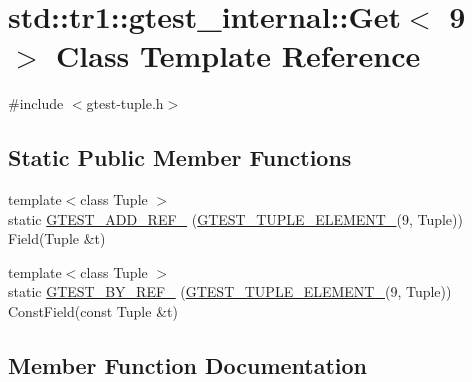 \hypertarget{classstd_1_1tr1_1_1gtest__internal_1_1Get_3_019_01_4}{}\section{std\+::tr1\+::gtest\+\_\+internal\+::Get$<$ 9 $>$ Class Template Reference}
\label{classstd_1_1tr1_1_1gtest__internal_1_1Get_3_019_01_4}


{\ttfamily \#include $<$gtest-\/tuple.\+h$>$}

\subsection*{Static Public Member Functions}
\begin{DoxyCompactItemize}
\item 
{\footnotesize template$<$class Tuple $>$ }\\static \mbox{\hyperlink{classstd_1_1tr1_1_1gtest__internal_1_1Get_3_019_01_4_add31197dfdb381d265e221ed62129f45}{G\+T\+E\+S\+T\+\_\+\+A\+D\+D\+\_\+\+R\+E\+F\+\_\+}} (\mbox{\hyperlink{gtest-tuple_8h_a1b7f133d8aa02e0b7afed7b66781eeb7}{G\+T\+E\+S\+T\+\_\+\+T\+U\+P\+L\+E\+\_\+\+E\+L\+E\+M\+E\+N\+T\+\_\+}}(9, Tuple)) Field(Tuple \&t)
\item 
{\footnotesize template$<$class Tuple $>$ }\\static \mbox{\hyperlink{classstd_1_1tr1_1_1gtest__internal_1_1Get_3_019_01_4_a5205e8da729e2bee446f5be0c65390af}{G\+T\+E\+S\+T\+\_\+\+B\+Y\+\_\+\+R\+E\+F\+\_\+}} (\mbox{\hyperlink{gtest-tuple_8h_a1b7f133d8aa02e0b7afed7b66781eeb7}{G\+T\+E\+S\+T\+\_\+\+T\+U\+P\+L\+E\+\_\+\+E\+L\+E\+M\+E\+N\+T\+\_\+}}(9, Tuple)) Const\+Field(const Tuple \&t)
\end{DoxyCompactItemize}


\subsection{Member Function Documentation}
\mbox{\label{classstd_1_1tr1_1_1gtest__internal_1_1Get_3_019_01_4_add31197dfdb381d265e221ed62129f45}} 
